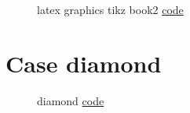 \documentclass{article}
\begin{document}
\begin{figure}[H]
    \centering
    
    \caption{latex graphics tikz book2 \href{https:/github.com/cauliyang/learn_tikz/blob/main/source/latex_graphics_tikz_book2.tex}{code} }
    \label{fig:latex graphics tikz book2}
\end{figure}

\section{Case diamond}

\begin{figure}[H]
    \centering
    
    \caption{diamond \href{https:/github.com/cauliyang/learn_tikz/blob/main/source/diamond.tex}{code} }
    \label{fig:diamond}
\end{figure}
\end{document}
